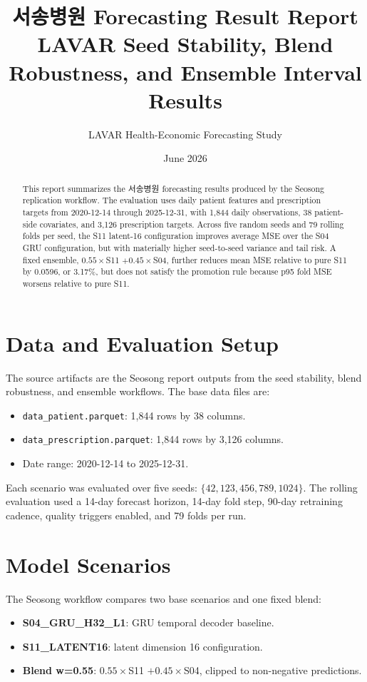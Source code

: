 \documentclass[11pt]{article}
\title{\textbf{서송병원 Forecasting Result Report}\\
\large LAVAR Seed Stability, Blend Robustness, and Ensemble Interval Results}
\author{LAVAR Health-Economic Forecasting Study}
\date{June 2026}
\begin{document}
\maketitle

\begin{abstract}
This report summarizes the 서송병원 forecasting results produced by the
Seosong replication workflow. The evaluation uses daily patient features
and prescription targets from 2020-12-14 through 2025-12-31, with 1,844
daily observations, 38 patient-side covariates, and 3,126 prescription
targets. Across five random seeds and 79 rolling folds per seed, the
S11 latent-16 configuration improves average MSE over the S04 GRU
configuration, but with materially higher seed-to-seed variance and tail
risk. A fixed ensemble, $0.55\times$S11 $+0.45\times$S04, further reduces
mean MSE relative to pure S11 by 0.0596, or 3.17\%, but does not satisfy
the promotion rule because p95 fold MSE worsens relative to pure S11.
\end{abstract}

\section{Data and Evaluation Setup}

The source artifacts are the Seosong report outputs from the seed
stability, blend robustness, and ensemble workflows. The base data files are:
\begin{itemize}
  \item \texttt{data\_patient.parquet}: 1,844 rows by 38 columns.
  \item \texttt{data\_prescription.parquet}: 1,844 rows by 3,126 columns.
  \item Date range: 2020-12-14 to 2025-12-31.
\end{itemize}

Each scenario was evaluated over five seeds:
$\{42, 123, 456, 789, 1024\}$. The rolling evaluation used a 14-day
forecast horizon, 14-day fold step, 90-day retraining cadence, quality
triggers enabled, and 79 folds per run.

\section{Model Scenarios}

The Seosong workflow compares two base scenarios and one fixed blend:
\begin{itemize}
  \item \textbf{S04\_GRU\_H32\_L1}: GRU temporal decoder baseline.
  \item \textbf{S11\_LATENT16}: latent dimension 16 configuration.
  \item \textbf{Blend w=0.55}: $0.55\times$S11 $+0.45\times$S04, clipped
  to non-negative predictions.
\end{itemize}
\end{document}

